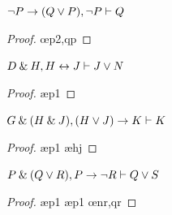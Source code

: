 \problempart
\begin{earg}
\item ${\neg} P \rightarrow (Q \vee P), {\neg} P \vdash Q$
\begin{proof}
	 \pr{}
	 \pr{}
	 
	 \oe{p2,qp}
\end{proof}
\medskip

\item $D \mathbin{\&} H, H \leftrightarrow J  \vdash J \vee N$ 
\begin{proof}
	 \pr{}
	 \pr{}
	 \ae{p1}
	 
	 
\end{proof}
\medskip

\filbreak
\item $G \mathbin{\&} (H \mathbin{\&} J), (H \vee J) \rightarrow K \vdash K$
\begin{proof}
	 \pr{}
	 \pr{}
	 \ae{p1}
	 \ae{hj}
	 
	 
\end{proof}
\medskip


\item $P \mathbin{\&} (Q \vee R), P \rightarrow {\neg} R \vdash Q \vee S$
\begin{proof}
	 \pr{}
	 \pr{}
	 \ae{p1}
	 
	 \ae{p1}
	 \oe{nr,qr}
	 
\end{proof}
\medskip
\end{earg}

